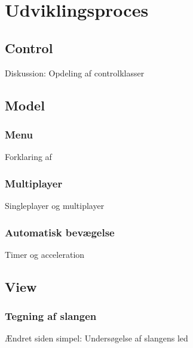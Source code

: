 \documentclass{report}
\begin{document}
\section{Udviklingsproces}
\subsection{Control}
Diskussion: Opdeling af controlklasser

\subsection{Model}
\subsubsection{Menu}
Forklaring af

\subsubsection{Multiplayer}
Singleplayer og multiplayer

\subsubsection{Automatisk bevægelse}
Timer og acceleration


\subsection{View}
\subsubsection{Tegning af slangen}
Ændret siden simpel: Undersøgelse af slangens led
\end{document}
